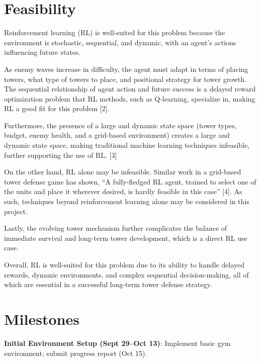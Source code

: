 \documentclass[12pt]{article}
\newcounter{ques}
\begin{document}
\section*{Feasibility}

Reinforcement learning (RL) is well-suited for this problem because the environment is stochastic, sequential, and dynamic, with an agent's actions influencing future states. \par 

As enemy waves increase in difficulty, the agent must adapt in terms of placing towers, what type of towers to place, and positional strategy for tower growth. The sequential relationship of agent action and future success is a delayed reward optimization problem that RL methods, such as Q-learning, specialize in, making RL a good fit for this problem [2]. \par

Furthermore, the presence of a large and dynamic state space (tower types, budget, enemy health, and a grid-based environment) creates a large and dynamic state space, making traditional machine learning techniques infeasible, further supporting the use of RL. [3] \par

On the other hand, RL alone may be infeasible. Similar work in a grid-based tower defense game has shown, “A fully-fledged RL agent, trained to select one of the units and place it wherever desired, is hardly feasible in this case” [4]. As such, techniques beyond reinforcement learning alone may be considered in this project. \par

Lastly, the evolving tower mechanism further complicates the balance of immediate survival and long-term tower development, which is a direct RL use case. \par

Overall, RL is well-suited for this problem due to its ability to handle delayed rewards,
dynamic environments, and complex sequential decision-making, all of which are essential in
a successful long-term tower defense strategy. \par


\section*{Milestones}

\textbf{Initial Environment Setup (Sept 29--Oct 13)}: Implement basic gym environment; submit progress report (Oct 15). 
\end{document}
